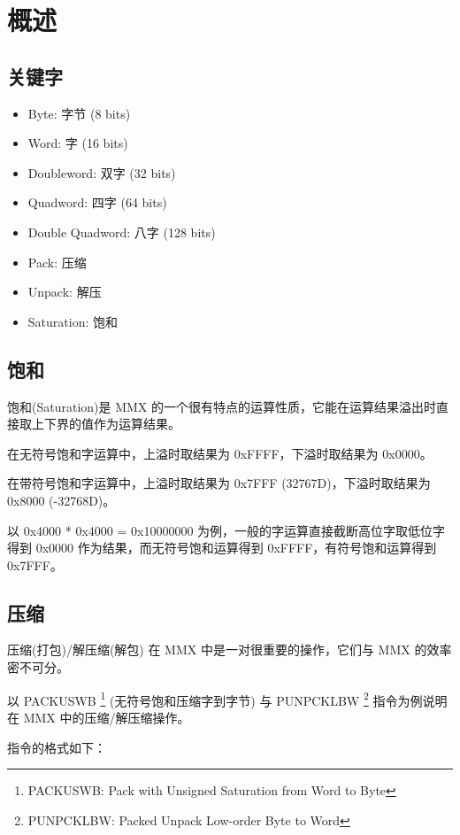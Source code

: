 \section{概述}

\subsection{关键字}

\begin{itemize}
    \item Byte: 字节 (8 bits)
    \item Word: 字 (16 bits)
    \item Doubleword: 双字 (32 bits)
    \item Quadword: 四字 (64 bits)
    \item Double Quadword: 八字 (128 bits)
    \item Pack: 压缩
    \item Unpack: 解压
    \item Saturation: 饱和
\end{itemize}

\subsection{饱和}

饱和(Saturation)是 MMX 的一个很有特点的运算性质，它能在运算结果溢出时直接取上下界的值作为运算结果。

在无符号饱和字运算中，上溢时取结果为 0xFFFF，下溢时取结果为 0x0000。

在带符号饱和字运算中，上溢时取结果为 0x7FFF (32767D)，下溢时取结果为 0x8000 (-32768D)。

以 0x4000 * 0x4000 = 0x10000000 为例，一般的字运算直接截断高位字取低位字得到 0x0000 作为结果，而无符号饱和运算得到 0xFFFF，有符号饱和运算得到 0x7FFF。

\subsection{压缩} \label{pack} 

压缩(打包)/解压缩(解包) 在 MMX 中是一对很重要的操作，它们与 MMX 的效率密不可分。

以 PACKUSWB \footnote{PACKUSWB: Pack with Unsigned Saturation from Word to Byte} (无符号饱和压缩字到字节) 与 PUNPCKLBW \footnote{PUNPCKLBW: Packed Unpack Low-order Byte to Word} 指令为例说明在 MMX 中的压缩/解压缩操作。

指令的格式如下：

